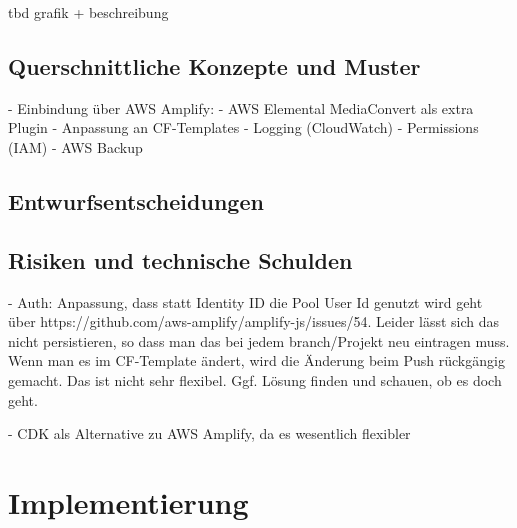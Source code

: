 tbd grafik + beschreibung

\subsection{Querschnittliche Konzepte und Muster}

- Einbindung über \ac{AWS} Amplify:
  - AWS Elemental MediaConvert als extra Plugin
  - Anpassung an CF-Templates
- Logging (CloudWatch)
- Permissions (IAM)
- AWS Backup

\subsection{Entwurfsentscheidungen}

\subsection{Risiken und technische Schulden}

- Auth: Anpassung, dass statt Identity ID die Pool User Id genutzt wird geht über https://github.com/aws-amplify/amplify-js/issues/54. Leider lässt sich das nicht persistieren, so dass man das bei jedem branch/Projekt neu eintragen muss. Wenn man es im CF-Template ändert, wird die Änderung beim Push rückgängig gemacht. Das ist nicht sehr flexibel. Ggf. Lösung finden und schauen, ob es doch geht.

- CDK als Alternative zu AWS Amplify, da es wesentlich flexibler

\section{Implementierung}